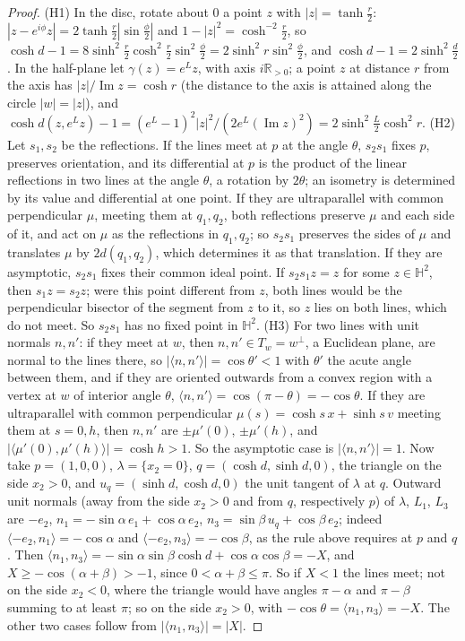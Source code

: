 \documentclass[pdflatex,sn-mathphys-num]{sn-jnl}
\theoremstyle{thmstyleone}%
\theoremstyle{thmstylethree}%
\newcommand{\R}{\mathbb{R}}
\newcommand{\Hb}{\mathbb{H}^2}
\begin{document}
\begin{proof}
(H1) In the disc, rotate about $0$ a point $z$ with $|z|=\tanh\frac r2$: $|z-e^{i\phi}z|=2\tanh\frac r2|\sin\frac\phi2|$ and $1-|z|^2=\cosh^{-2}\frac r2$, so $\cosh d-1=8\sinh^2\frac r2\cosh^2\frac r2\sin^2\frac\phi2=2\sinh^2r\sin^2\frac\phi2$, and $\cosh d-1=2\sinh^2\frac d2$. In the half-plane let $\gamma(z)=e^Lz$, with axis $i\R_{>0}$; a point $z$ at distance $r$ from the axis has $|z|/\operatorname{Im}z=\cosh r$ (the distance to the axis is attained along the circle $|w|=|z|$), and $\cosh d(z,e^Lz)-1=(e^L-1)^2|z|^2/(2e^L(\operatorname{Im}z)^2)=2\sinh^2\frac L2\cosh^2r$.
(H2) Let $s_1,s_2$ be the reflections. If the lines meet at $p$ at the angle $\theta$, $s_2s_1$ fixes $p$, preserves orientation, and its differential at $p$ is the product of the linear reflections in two lines at the angle $\theta$, a rotation by $2\theta$; an isometry is determined by its value and differential at one point. If they are ultraparallel with common perpendicular $\mu$, meeting them at $q_1,q_2$, both reflections preserve $\mu$ and each side of it, and act on $\mu$ as the reflections in $q_1,q_2$; so $s_2s_1$ preserves the sides of $\mu$ and translates $\mu$ by $2d(q_1,q_2)$, which determines it as that translation. If they are asymptotic, $s_2s_1$ fixes their common ideal point. If $s_2s_1z=z$ for some $z\in\Hb$, then $s_1z=s_2z$; were this point different from $z$, both lines would be the perpendicular bisector of the segment from $z$ to it, so $z$ lies on both lines, which do not meet. So $s_2s_1$ has no fixed point in $\Hb$.
(H3) For two lines with unit normals $n,n'$: if they meet at $w$, then $n,n'\in T_w=w^\perp$, a Euclidean plane, are normal to the lines there, so $|\langle n,n'\rangle|=\cos\theta'<1$ with $\theta'$ the acute angle between them, and if they are oriented outwards from a convex region with a vertex at $w$ of interior angle $\theta$, $\langle n,n'\rangle=\cos(\pi-\theta)=-\cos\theta$. If they are ultraparallel with common perpendicular $\mu(s)=\cosh s\,x+\sinh s\,v$ meeting them at $s=0,h$, then $n,n'$ are $\pm\mu'(0)$, $\pm\mu'(h)$, and $|\langle\mu'(0),\mu'(h)\rangle|=\cosh h>1$. So the asymptotic case is $|\langle n,n'\rangle|=1$. Now take $p=(1,0,0)$, $\lambda=\{x_2=0\}$, $q=(\cosh d,\sinh d,0)$, the triangle on the side $x_2>0$, and $u_q=(\sinh d,\cosh d,0)$ the unit tangent of $\lambda$ at $q$. Outward unit normals (away from the side $x_2>0$ and from $q$, respectively $p$) of $\lambda$, $L_1$, $L_3$ are $-e_2$, $n_1=-\sin\alpha\,e_1+\cos\alpha\,e_2$, $n_3=\sin\beta\,u_q+\cos\beta\,e_2$; indeed $\langle-e_2,n_1\rangle=-\cos\alpha$ and $\langle-e_2,n_3\rangle=-\cos\beta$, as the rule above requires at $p$ and $q$. Then $\langle n_1,n_3\rangle=-\sin\alpha\sin\beta\cosh d+\cos\alpha\cos\beta=-X$, and $X\ge-\cos(\alpha+\beta)>-1$, since $0<\alpha+\beta\le\pi$. So if $X<1$ the lines meet; not on the side $x_2<0$, where the triangle would have angles $\pi-\alpha$ and $\pi-\beta$ summing to at least $\pi$; so on the side $x_2>0$, with $-\cos\theta=\langle n_1,n_3\rangle=-X$. The other two cases follow from $|\langle n_1,n_3\rangle|=|X|$.
\end{proof}
\end{document}
